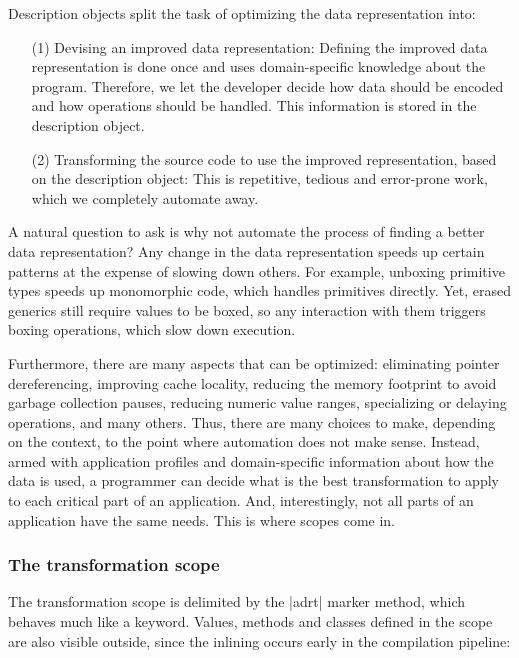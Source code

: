 Description objects split the task of optimizing the data representation into:


\begin{itemize}
\item[(1)] Devising an improved data representation: Defining the improved data representation is done once and uses domain-specific knowledge about the program. Therefore, we let the developer decide how data should be encoded and how operations should be handled. This information is stored in the description object.
\item[(2)] Transforming the source code to use the improved representation, based on the description object: This is repetitive, tedious and error-prone work, which we completely automate away.
\end{itemize}


A natural question to ask is why not automate the process of finding a better data representation? Any change in the data representation speeds up certain patterns at the expense of slowing down others. For example, unboxing primitive types speeds up monomorphic code, which handles primitives directly. Yet, erased generics still require values to be boxed, so any interaction with them triggers boxing operations, which slow down execution.

Furthermore, there are many aspects that can be optimized: eliminating pointer dereferencing, improving cache locality, reducing the memory footprint to avoid garbage collection pauses, reducing numeric value ranges, specializing or delaying operations, and many others. Thus, there are many choices to make, depending on the context, to the point where automation does not make sense. Instead, armed with application profiles and domain-specific information about how the data is used, a programmer can decide what is the best transformation to apply to each critical part of an application. And, interestingly, not all parts of an application have the same needs. This is where scopes come in.



\subsubsection*{The transformation scope}

The transformation scope is delimited by the |adrt| marker method, which behaves much like a keyword. Values, methods and classes defined in the scope are also visible outside, since the inlining occurs early in the compilation pipeline:

